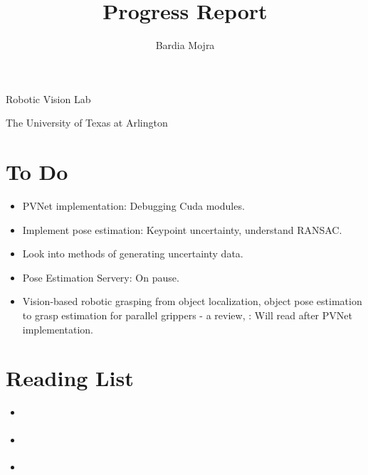 \documentclass[11pt]{article}
\title{Progress Report}
\author{Bardia Mojra}
\begin{document}
\maketitle
\thispagestyle{empty}

\bigskip
\bigskip
\begin{center}
      Robotic Vision Lab
\end{center}

\begin{center}
      The University of Texas at Arlington
\end{center}

\newpage

\section{To Do}
\begin{itemize}
      \item PVNet implementation: Debugging Cuda modules.
      \item Implement pose estimation: Keypoint uncertainty, understand RANSAC.
      \item Look into methods of generating uncertainty data.
      \item Pose Estimation Servery: On pause.
      \item Vision-based robotic grasping from object localization, object pose
      estimation to grasp estimation for parallel grippers - a review,
      \cite{du2020vision}: Will read after PVNet implementation.
\end{itemize}

\section{Reading List}
\begin{itemize}
      \item \cite{ferraz2014leveraging}
      \item \cite{he2015deep}
      \item \cite{du2020vision}
\end{itemize}
\end{document}
